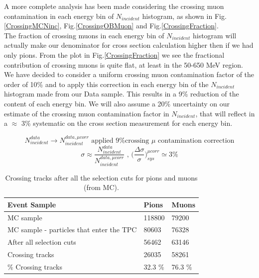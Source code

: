 A more complete analysis has been made considering the crossing muon contamination in each energy bin of $N_{incident}$ histogram, as shown in Fig.\ref{CrossingMCNinc}, Fig.\ref{CrossingOBMuon} and Fig.\ref{CrossingFraction}. \\
The fraction of crossing muons in each energy bin of $N_{incident}$ histogram will actually make our denominator for cross section calculation higher then if we had only pions.
From the plot in Fig.\ref{CrossingFraction} we see the fractional contribution of crossing muons is quite flat, at least in the 50-650 MeV region.
We have decided to consider a uniform crossing muon contamination factor of the order of 10\% and to apply this correction in each energy bin of the $N_{incident}$ histogram made from our Data sample. This results in a 9\% reduction of the content of each energy bin. We will also assume a 20\% uncertainty on our estimate of the crossing muon contamination factor in $N_{incident}$, that will reflect in a $\approx$ 3\% systematic on the cross section measurement for each energy bin.

$$ N_{incident}^{data} \longrightarrow N_{incident}^{data, \mu corr} \text{ applied 9\% crossing $\mu$ contamination correction}$$
$$\sigma \approx \frac{N_{incident}^{data}}{N_{incident}^{data, \mu corr}} \text{ , } \Big(\frac{\Delta\sigma}{\sigma}\Big)_{sys}^{\mu corr} \simeq 3 \% $$ 


\begin{table}[ht!]
\centering
\begin{tabular}{|l|l|l|}
\hline
\textbf{Event Sample}                                                                                 & {\textbf{Pions}} & {\textbf{Muons}} \\ \hline \hline
MC sample                                                                                     & 118800 & 79200 \\ \hline
MC sample - particles that enter the TPC                                                      & 80603 & 76328 \\ \hline
After all selection cuts                                                                      & 56462 & 63146 \\ \hline
Crossing tracks                                                                               & 26035  & 58261 \\ \hline
\% Crossing tracks  & 32.3 \% & 76.3 \% \\ \hline
\end{tabular}
\caption{Crossing tracks after all the selection cuts for pions and muons (from MC).}
\label{tab:CrossingMC}
\end{table}


